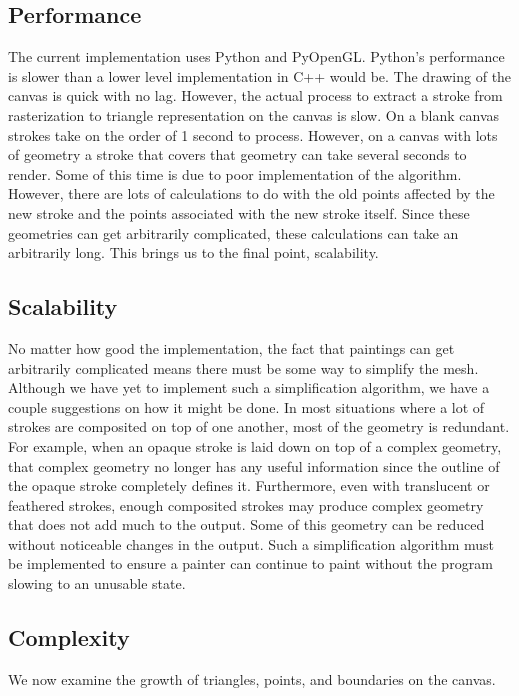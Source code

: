 \documentclass[conference]{acmsiggraph}
\begin{document}
\subsection{Performance}
The current implementation uses Python and PyOpenGL. Python's performance is slower than
a lower level implementation in C++ would be. The drawing of the canvas is quick with
no lag. However, the actual process to extract a stroke from rasterization to triangle
representation on the canvas is slow. On a blank canvas strokes take on the order of
1 second to process. However, on a canvas with lots of geometry a stroke that covers
that geometry can take several seconds to render. Some of this time is due to poor
implementation of the algorithm. However, there are lots of calculations
to do with the old points affected by the new stroke and the points associated with the
new stroke itself. Since these geometries can get arbitrarily complicated, these
calculations can take an arbitrarily long. This brings us to the final point, scalability.

\subsection{Scalability}
No matter how good the implementation, the fact that paintings can get arbitrarily complicated
means there must be some way to simplify the mesh. Although we have yet to implement
such a simplification algorithm, we have a couple suggestions on how it might be done. In most situations where
a lot of strokes are composited on top of one another, most of the geometry is redundant. 
For example, when an opaque stroke is laid down on top of a complex geometry, that complex
geometry no longer has any useful information since the outline of the opaque stroke
completely defines it. Furthermore, even with translucent or feathered strokes, enough
composited strokes may produce complex geometry that does not add much to the output.
Some of this geometry can be reduced without noticeable changes in the output. Such a
simplification algorithm must be implemented to ensure a painter can continue to paint
without the program slowing to an unusable state.

\subsection{Complexity}
We now examine the growth of triangles, points, and boundaries on the canvas.
\end{document}
